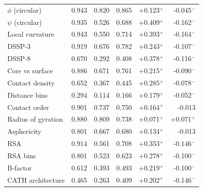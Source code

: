 \begin{table}[!htbp]
\begin{tabular}[t]{@{}lrrrrr@{}}
$\phi$ (circular) & 0.943 & 0.820 & 0.865 & +0.123$^{+}$ & -0.045$^{-}$ \\
$\psi$ (circular) & 0.935 & 0.526 & 0.688 & +0.409$^{+}$ & -0.162$^{-}$ \\
Local curvature & 0.943 & 0.550 & 0.714 & +0.393$^{+}$ & -0.164$^{-}$ \\
DSSP-3 & 0.919 & 0.676 & 0.782 & +0.243$^{+}$ & -0.107$^{-}$ \\
DSSP-8 & 0.670 & 0.292 & 0.408 & +0.378$^{+}$ & -0.116$^{-}$ \\
Core vs surface & 0.886 & 0.671 & 0.761 & +0.215$^{+}$ & -0.090$^{-}$ \\
Contact density & 0.652 & 0.367 & 0.445 & +0.285$^{+}$ & -0.078$^{-}$ \\
Distance bins & 0.294 & 0.114 & 0.166 & +0.179$^{+}$ & -0.052$^{-}$ \\
Contact order & 0.901 & 0.737 & 0.750 & +0.164$^{+}$ & -0.013\phantom{$^{+}$} \\
Radius of gyration & 0.880 & 0.809 & 0.738 & +0.071$^{+}$ & +0.071$^{+}$ \\
Asphericity & 0.801 & 0.667 & 0.680 & +0.134$^{+}$ & -0.013\phantom{$^{+}$} \\
\midrule
RSA & 0.914 & 0.561 & 0.708 & +0.353$^{+}$ & -0.146$^{-}$ \\
RSA bins & 0.801 & 0.523 & 0.623 & +0.278$^{+}$ & -0.100$^{-}$ \\
B-factor & 0.612 & 0.393 & 0.493 & +0.219$^{+}$ & -0.100$^{-}$ \\
CATH architecture & 0.465 & 0.263 & 0.409 & +0.202$^{+}$ & -0.146$^{-}$ \\
\bottomrule
\end{tabular}
\end{table}
